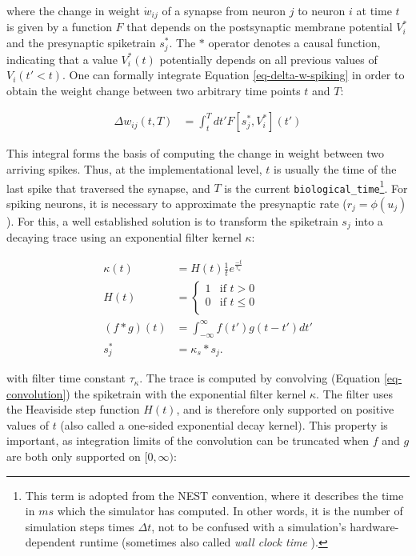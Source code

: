 where the change in weight $\dot{w}_{ij}$ of a synapse from neuron $j$ to neuron $i$ at time $t$ is given by a function
$F$ that depends on the postsynaptic membrane potential $V_i^\ast$ and the presynaptic spiketrain $s_j^\ast$.
The $\ast$ operator denotes a causal function, indicating that a value $V_i^\ast(t)$ potentially depends on all previous
values of $V_i(t' < t)$. One can formally integrate Equation \ref{eq-delta-w-spiking} in order to obtain the weight
change between two arbitrary time points $t$ and $T$:

\begin{align}
  \Delta w_{ij}(t,T) & = \int_t^T dt' F[s_j^\ast, V_i^\ast](t') \label{eq-delta-w-t-T}
\end{align}

This integral forms the basis of computing the change in weight between two arriving spikes. Thus, at the
implementational level, $t$ is usually the time of the last spike that traversed the synapse, and $T$ is the current
\texttt{biological\_time}\footnote{This term is adopted from the NEST convention, where it describes the time in $ms$
which the simulator has computed. In other words, it is the number of simulation steps times $\Delta t$, not to be
confused with a simulation's hardware-dependent runtime (sometimes also called \textit{wall clock time}
\citep{albada2018performance}). }. For spiking neurons, it is necessary to approximate the presynaptic rate
($r_j=\phi(u_j)$). For this, a well established solution is to transform the spiketrain $s_j$ into a decaying trace
using an exponential filter kernel $\kappa$:

\begin{align}
  \kappa(t)     & = H(t) \frac{1}{t}e^{\frac{-t}{\tau_{\kappa}}}                        \\
  H(t)          & =
  \begin{cases}
    1 & \text{if $t > 0$}    \\
    0 & \text{if $t \leq 0$} \\
  \end{cases}                                                              \\
  (f \ast g)(t) & = \int_{- \infty }^{\infty} f(t') g(t-t') d t' \label{eq-convolution} \\
  s_j^\ast      & = \kappa_s \ast s_j. \label{eq-spike-trace}
\end{align}

with filter time constant $\tau_\kappa$. The trace is computed by convolving (Equation \ref{eq-convolution}) the
spiketrain with the exponential filter kernel $\kappa$. The filter uses the Heaviside step function $H(t)$, and is
therefore only supported on positive values of $t$ (also called a one-sided exponential decay kernel). This property is
important, as integration limits of the convolution can be truncated when $f$ and $g$ are both only supported on
$[0,\infty)$:

